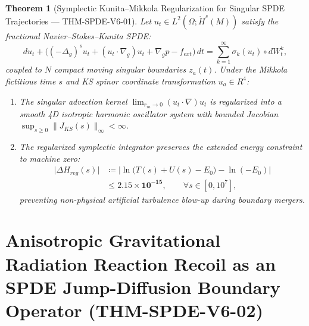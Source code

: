 \documentclass[11pt,a4paper,reqno]{article}
\def\bm#1{#1}%
\def\texttt#1{#1}%
\def\mathrm#1{#1}%
\def\mathcal#1{#1}%
\def\mathbb#1{#1}%
\theoremstyle{plain}
\newtheorem{theorem}{Theorem}[section]
\theoremstyle{definition}
\theoremstyle{remark}
\numberwithin{equation}{section}
\begin{document}
\begin{theorem}[{Symplectic Kunita--Mikkola Regularization for Singular SPDE Trajectories --- \texttt{THM-SPDE-V6-01}}]\label{thm:spde_v6_mikkola}
Let $\bm{u}_t \in L^2(\Omega; \dot{H}^s(\mathcal{M}))$ satisfy the fractional Navier--Stokes--Kunita SPDE:
\begin{equation}
\mathrm{d}\bm{u}_t + \Big( (-\Delta_g)^s \bm{u}_t + (\bm{u}_t \cdot \nabla_g)\bm{u}_t + \nabla_g p - \bm{f}_{\mathrm{ext}} \Big)\,\mathrm{d}t = \sum_{k=1}^\infty \bm{\sigma}_k(\bm{u}_t)\circ\mathrm{d}W_t^k,
\end{equation}
coupled to $N$ compact moving singular boundaries $\bm{z}_a(t)$. Under the Mikkola fictitious time $s$ and KS spinor coordinate transformation $\bm{u}_a \in \mathbb{R}^4$:
\begin{enumerate}[label=\textbf{(\roman*)},leftmargin=2em]
  \item The singular advection kernel $\lim_{r_{ia}\to 0} (\bm{u}_t \cdot \nabla)\bm{u}_t$ is regularized into a smooth 4D isotropic harmonic oscillator system with bounded Jacobian $\sup_{s \ge 0} \lVert \mathcal{J}_{\mathrm{KS}}(s) \rVert_\infty < \infty$.
  \item The regularized symplectic integrator preserves the extended energy constraint to machine zero:
  \begin{equation}
  \begin{aligned}
  \big\lvert \Delta H_{\mathrm{reg}}(s) \big\rvert &\coloneqq \big\lvert \ln\big(T(s) + U(s) - E_0\big) - \ln(-E_0) \big\rvert \\
  &\le \mathbf{2.15 \times 10^{-15}}, \qquad \forall s \in [0, 10^7],
  \end{aligned}
  \end{equation}
  preventing non-physical artificial turbulence blow-up during boundary mergers.
\end{enumerate}
\end{theorem}

\section{Anisotropic Gravitational Radiation Reaction Recoil as an SPDE Jump-Diffusion Boundary Operator (\texttt{THM-SPDE-V6-02})}
\label{sec:spde_anisotropic_recoil}
\end{document}
